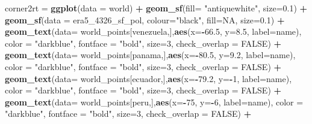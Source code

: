 \documentclass[12pt,oneside]{reedthesis}
\newenvironment{Shaded}{\begin{snugshade}}{\end{snugshade}}
\newcommand{\DataTypeTok}[1]{\textcolor[rgb]{0.13,0.29,0.53}{#1}}
\newcommand{\DecValTok}[1]{\textcolor[rgb]{0.00,0.00,0.81}{#1}}
\newcommand{\FloatTok}[1]{\textcolor[rgb]{0.00,0.00,0.81}{#1}}
\newcommand{\KeywordTok}[1]{\textcolor[rgb]{0.13,0.29,0.53}{\textbf{#1}}}
\newcommand{\NormalTok}[1]{#1}
\newcommand{\OperatorTok}[1]{\textcolor[rgb]{0.81,0.36,0.00}{\textbf{#1}}}
\newcommand{\OtherTok}[1]{\textcolor[rgb]{0.56,0.35,0.01}{#1}}
\newcommand{\StringTok}[1]{\textcolor[rgb]{0.31,0.60,0.02}{#1}}
\begin{document}
\begin{Shaded}
\begin{Highlighting}[]
\NormalTok{corner2rt =}\StringTok{ }\KeywordTok{ggplot}\NormalTok{(}\DataTypeTok{data =}\NormalTok{ world) }\OperatorTok{+}\StringTok{ }
\StringTok{  }\KeywordTok{geom_sf}\NormalTok{(}\DataTypeTok{fill=} \StringTok{"antiquewhite"}\NormalTok{,  }\DataTypeTok{size=}\FloatTok{0.1}\NormalTok{) }\OperatorTok{+}\StringTok{ }
\StringTok{  }\KeywordTok{geom_sf}\NormalTok{(}\DataTypeTok{data =}\NormalTok{ era5_}\DecValTok{4326}\NormalTok{_sf_pol, }\DataTypeTok{colour=}\StringTok{"black"}\NormalTok{, }\DataTypeTok{fill=}\OtherTok{NA}\NormalTok{, }\DataTypeTok{size=}\FloatTok{0.1}\NormalTok{) }\OperatorTok{+}\StringTok{ }
\StringTok{  }\KeywordTok{geom_text}\NormalTok{(}\DataTypeTok{data=}\NormalTok{ world_points[venezuela,],}\KeywordTok{aes}\NormalTok{(}\DataTypeTok{x=}\OperatorTok{-}\FloatTok{66.5}\NormalTok{, }\DataTypeTok{y=}\FloatTok{8.5}\NormalTok{, }\DataTypeTok{label=}\NormalTok{name), }\DataTypeTok{color =} \StringTok{"darkblue"}\NormalTok{, }\DataTypeTok{fontface =} \StringTok{"bold"}\NormalTok{, }\DataTypeTok{size=}\DecValTok{3}\NormalTok{, }\DataTypeTok{check_overlap =} \OtherTok{FALSE}\NormalTok{) }\OperatorTok{+}
\StringTok{  }\KeywordTok{geom_text}\NormalTok{(}\DataTypeTok{data=}\NormalTok{ world_points[panama,],}\KeywordTok{aes}\NormalTok{(}\DataTypeTok{x=}\OperatorTok{-}\FloatTok{80.5}\NormalTok{, }\DataTypeTok{y=}\FloatTok{9.2}\NormalTok{, }\DataTypeTok{label=}\NormalTok{name), }\DataTypeTok{color =} \StringTok{"darkblue"}\NormalTok{, }\DataTypeTok{fontface =} \StringTok{"bold"}\NormalTok{, }\DataTypeTok{size=}\DecValTok{3}\NormalTok{, }\DataTypeTok{check_overlap =} \OtherTok{FALSE}\NormalTok{) }\OperatorTok{+}\StringTok{ }
\StringTok{  }\KeywordTok{geom_text}\NormalTok{(}\DataTypeTok{data=}\NormalTok{ world_points[ecuador,],}\KeywordTok{aes}\NormalTok{(}\DataTypeTok{x=}\OperatorTok{-}\FloatTok{79.2}\NormalTok{, }\DataTypeTok{y=}\OperatorTok{-}\DecValTok{1}\NormalTok{, }\DataTypeTok{label=}\NormalTok{name), }\DataTypeTok{color =} \StringTok{"darkblue"}\NormalTok{, }\DataTypeTok{fontface =} \StringTok{"bold"}\NormalTok{, }\DataTypeTok{size=}\DecValTok{3}\NormalTok{, }\DataTypeTok{check_overlap =} \OtherTok{FALSE}\NormalTok{) }\OperatorTok{+}
\StringTok{  }\KeywordTok{geom_text}\NormalTok{(}\DataTypeTok{data=}\NormalTok{ world_points[peru,],}\KeywordTok{aes}\NormalTok{(}\DataTypeTok{x=}\OperatorTok{-}\DecValTok{75}\NormalTok{, }\DataTypeTok{y=}\OperatorTok{-}\DecValTok{6}\NormalTok{, }\DataTypeTok{label=}\NormalTok{name), }\DataTypeTok{color =} \StringTok{"darkblue"}\NormalTok{, }\DataTypeTok{fontface =} \StringTok{"bold"}\NormalTok{, }\DataTypeTok{size=}\DecValTok{3}\NormalTok{, }\DataTypeTok{check_overlap =} \OtherTok{FALSE}\NormalTok{) }\OperatorTok{+}

\end{Highlighting}
\end{Shaded}
\end{document}
